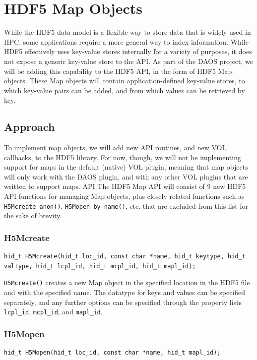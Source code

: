 \section{HDF5 Map Objects}


While the HDF5 data model is a flexible way to store data that is widely used in HPC, some applications require a more general way to index information. While HDF5 effectively uses key-value stores internally for a variety of purposes, it does not expose a generic key-value store to the API. As part of the DAOS project, we will be adding this capability to the HDF5 API, in the form of HDF5 Map objects. These Map objects will contain application-defined key-value stores, to which key-value pairs can be added, and from which values can be retrieved by key.

\subsection{Approach}
To implement map objects, we will add new API routines, and new VOL callbacks, to the HDF5 library. For now, though, we will not be implementing support for maps in the default (native) VOL plugin, meaning that map objects will only work with the DAOS plugin, and with any other VOL plugins that are written to support maps.
API
The HDF5 Map API will consist of 9 new HDF5 API functions for managing Map objects, plus closely related functions such as \verb+H5Mcreate_anon()+, \verb+H5Mopen_by_name()+, etc. that are excluded from this list for the sake of brevity.

\subsubsection{H5Mcreate}

{
\begin{lstlisting}
hid_t H5Mcreate(hid_t loc_id, const char *name, hid_t keytype, hid_t valtype, hid_t lcpl_id, hid_t mcpl_id, hid_t mapl_id);
\end{lstlisting}
}

\verb+H5Mcreate()+ creates a new Map object in the specified location in the HDF5 file and with the specified name. The datatype for keys and values can be specified separately, and any further options can be specified through the property lists \verb+lcpl_id+, \verb+mcpl_id+, and \verb+mapl_id+.


\subsubsection{H5Mopen}
{
\begin{lstlisting}
hid_t H5Mopen(hid_t loc_id, const char *name, hid_t mapl_id);
\end{lstlisting}
}

